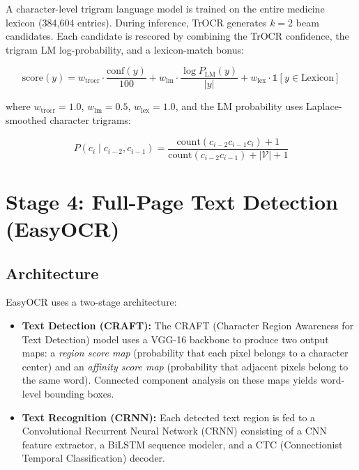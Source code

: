 \documentclass[12pt,a4paper,oneside]{report}
\begin{document}
A character-level trigram language model is trained on the entire medicine lexicon (384{,}604 entries). During inference, TrOCR generates $k=2$ beam candidates. Each candidate is rescored by combining the TrOCR confidence, the trigram LM log-probability, and a lexicon-match bonus:

\begin{equation}
\text{score}(y) = w_{\text{trocr}} \cdot \frac{\text{conf}(y)}{100} + w_{\text{lm}} \cdot \frac{\log P_{\text{LM}}(y)}{|y|} + w_{\text{lex}} \cdot \mathbb{1}[y \in \text{Lexicon}]
\end{equation}

where $w_{\text{trocr}} = 1.0$, $w_{\text{lm}} = 0.5$, $w_{\text{lex}} = 1.0$, and the LM probability uses Laplace-smoothed character trigrams:

\begin{equation}
P(c_i \mid c_{i-2}, c_{i-1}) = \frac{\text{count}(c_{i-2} c_{i-1} c_i) + 1}{\text{count}(c_{i-2} c_{i-1}) + |\mathcal{V}| + 1}
\end{equation}


\section{Stage 4: Full-Page Text Detection (EasyOCR)}

\subsection{Architecture}

EasyOCR uses a two-stage architecture:

\begin{itemize}
  \item \textbf{Text Detection (CRAFT):} The CRAFT (Character Region Awareness for Text Detection) model uses a VGG-16 backbone to produce two output maps: a \emph{region score map} (probability that each pixel belongs to a character center) and an \emph{affinity score map} (probability that adjacent pixels belong to the same word). Connected component analysis on these maps yields word-level bounding boxes.
  \item \textbf{Text Recognition (CRNN):} Each detected text region is fed to a Convolutional Recurrent Neural Network (CRNN) consisting of a CNN feature extractor, a BiLSTM sequence modeler, and a CTC (Connectionist Temporal Classification) decoder.
\end{itemize}
\end{document}
